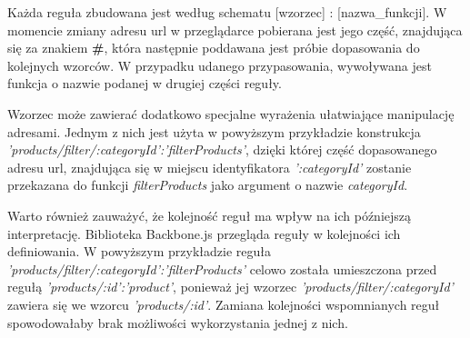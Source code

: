 Każda reguła zbudowana jest według schematu [wzorzec] : [nazwa\_funkcji]. W momencie zmiany adresu url w przeglądarce pobierana jest jego część, znajdująca się za znakiem \textbf{\#}, która następnie poddawana jest próbie dopasowania do kolejnych wzorców. W przypadku udanego przypasowania, wywoływana jest funkcja o nazwie podanej w drugiej części reguły.

Wzorzec może zawierać dodatkowo specjalne wyrażenia ułatwiające manipulację adresami. Jednym z nich jest użyta w powyższym przykładzie konstrukcja \textit{'products/filter/:categoryId':'filterProducts'}, dzięki której część dopasowanego adresu url, znajdująca się w miejscu identyfikatora \textit{':categoryId'} zostanie przekazana do funkcji \textit{filterProducts} jako argument o nazwie \textit{categoryId}.

Warto również zauważyć, że kolejność reguł ma wpływ na ich późniejszą interpretację. Biblioteka Backbone.js przegląda reguły w kolejności ich definiowania. W powyższym przykładzie reguła \textit{'products/filter/:categoryId':'filterProducts'} celowo została umieszczona przed regułą \textit{'products/:id':'product'}, ponieważ jej wzorzec \textit{'products/filter/:categoryId'} zawiera się we wzorcu \textit{'products/:id'}. Zamiana kolejności wspomnianych reguł spowodowałaby brak możliwości wykorzystania jednej z nich.\cite{backbone}